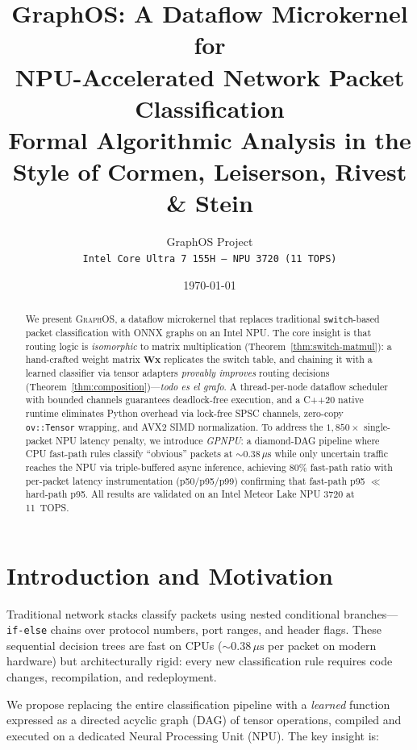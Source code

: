 \documentclass[11pt,a4paper,twoside]{article}
\title{%
  \LARGE \textbf{GraphOS: A Dataflow Microkernel for\\ NPU-Accelerated Network Packet Classification}\\[0.5em]
  \large Formal Algorithmic Analysis in the Style of Cormen, Leiserson, Rivest \& Stein
}
\author{
  GraphOS Project\\
  \texttt{Intel Core Ultra 7 155H --- NPU 3720 (11 TOPS)}
}
\date{\today}
\theoremstyle{definition}
\theoremstyle{remark}
\newcommand{\mat}[1]{\mathbf{#1}}
\newcommand{\vect}[1]{\mathbf{#1}}
\begin{document}
\maketitle

\begin{abstract}
We present \textsc{GraphOS}, a dataflow microkernel that replaces traditional \texttt{switch}-based packet classification with ONNX graphs on an Intel NPU.
The core insight is that routing logic is \emph{isomorphic} to matrix multiplication (Theorem~\ref{thm:switch-matmul}): a hand-crafted weight matrix $\mat{W}\vect{x}$ replicates the switch table, and chaining it with a learned classifier via tensor adapters \emph{provably improves} routing decisions (Theorem~\ref{thm:composition})---\emph{todo es el grafo}.
A thread-per-node dataflow scheduler with bounded channels guarantees deadlock-free execution, and a C++20 native runtime eliminates Python overhead via lock-free SPSC channels, zero-copy \texttt{ov::Tensor} wrapping, and AVX2 SIMD normalization.
To address the $1{,}850\times$ single-packet NPU latency penalty, we introduce \emph{GPNPU}: a diamond-DAG pipeline where CPU fast-path rules classify ``obvious'' packets at ${\sim}0.38\,\mu\text{s}$ while only uncertain traffic reaches the NPU via triple-buffered async inference, achieving 80\% fast-path ratio with per-packet latency instrumentation (p50/p95/p99) confirming that fast-path p95 $\ll$ hard-path p95.
All results are validated on an Intel Meteor Lake NPU 3720 at 11~TOPS.
\end{abstract}

\tableofcontents
\newpage

\section{Introduction and Motivation}
\label{sec:intro}

Traditional network stacks classify packets using nested conditional branches---\texttt{if-else} chains over protocol numbers, port ranges, and header flags.
These sequential decision trees are fast on CPUs (${\sim}0.38\,\mu\text{s}$ per packet on modern hardware) but architecturally rigid: every new classification rule requires code changes, recompilation, and redeployment.

We propose replacing the entire classification pipeline with a \emph{learned} function expressed as a directed acyclic graph (DAG) of tensor operations, compiled and executed on a dedicated Neural Processing Unit (NPU).
The key insight is:
\end{document}
